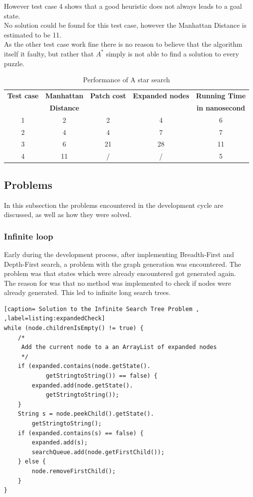 \documentclass[journal]{IEEEtran}
\begin{document}
However test case 4 shows that a good heuristic does not always leads to a goal state. \\
No solution could be found for this test case, however the Manhattan Distance is estimated to be 11. \\
As the other test case work fine there is no reason to believe that the algorithm itself it faulty, but rather that $A^*$ simply is not able to find a solution to every puzzle. 


\begin{table}[h]
\renewcommand{\arraystretch}{1.3}
\centering
\caption{Performance of A star search}
\begin{tabular}{|c|c|c|c|c|}
\hline
\bfseries Test case & \bfseries Manhattan & \bfseries Patch cost & \bfseries Expanded nodes & \bfseries Running Time \\
 &\bfseries Distance & & &\bfseries in nanosecond\\\hline
1 & 2 & 2 & 4 & 6 \\
2 & 4 & 4 & 7 & 7 \\
3 & 6 & 21 & 28 & 11\\ 
4 & 11 & / & / &  5 \\\hline 
\end{tabular}
\label{tab:astar}
\end{table}

\subsection{Problems}
In this subsection the problems encountered in the development cycle are discussed, as well as how they were solved.\\

\subsubsection{Infinite loop}
Early during the development process, after implementing Breadth-First and Depth-First search, a problem with the graph generation was encountered. The problem was that states which were already encountered got generated again. \\
The reason for was that no method was implemented to check if nodes were already generated. This led to infinite long search trees.\\ 
\begin{lstlisting}[caption= Solution to the Infinite Search Tree Problem , ,label=listing:expandedCheck]
while (node.childrenIsEmpty() != true) {
	/*
	 Add the current node to a an ArrayList of expanded nodes
	 */
	if (expanded.contains(node.getState().
			getStringtoString()) == false) {
		expanded.add(node.getState().
			getStringtoString());
	}
	String s = node.peekChild().getState().
		getStringtoString();
	if (expanded.contains(s) == false) {
		expanded.add(s);
		searchQueue.add(node.getFirstChild());
	} else {
		node.removeFirstChild();
	}
}
\end{lstlisting}
\end{document}
